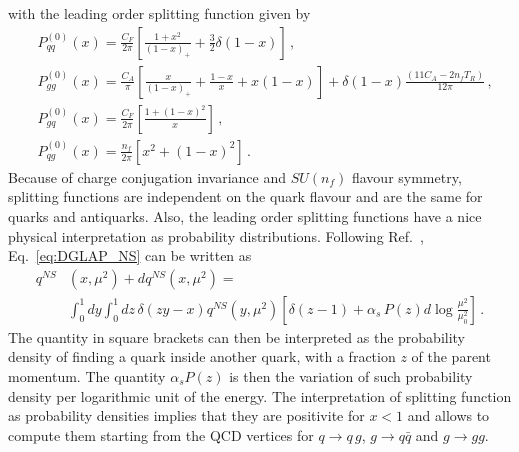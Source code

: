 with the leading order splitting function given by
\begin{align}
    &P_{qq}^{(0)}\left(x\right) = \frac{C_F}{2\pi}\left[\frac{1+x^2}{\left(1-x\right)_+} 
    + \frac{3}{2}\delta\left(1-x\right)\right]\,,\nonumber \\
    &P_{gg}^{(0)}\left(x\right) = \frac{C_A}{\pi}\left[\frac{x}{\left(1-x\right)_+}
    + \frac{1-x}{x} + x\left(1-x\right)\right] 
    +\delta\left(1-x\right)\frac{\left(11C_A - 2n_f T_R\right)}{12\pi}\,, \nonumber \\
    &P_{gq}^{(0)}\left(x\right) = \frac{C_F}{2\pi}\left[\frac{1+\left(1-x\right)^2}{x}\right]\,, \nonumber \\
    &P_{qg}^{(0)}\left(x\right) = \frac{n_f}{2\pi}\left[x^2+\left(1-x\right)^2\right]\,.
\end{align}
Because of charge conjugation invariance and $SU(n_f)$ flavour symmetry, splitting functions are independent on the quark
flavour and are the same for quarks and antiquarks. 
Also, the leading order splitting functions have a nice physical interpretation as probability distributions.
Following Ref.~\cite{ALTARELLI1977298}, Eq.~\eqref{eq:DGLAP_NS} can be written as
\begin{align}
    q^{NS}&\left(x,\mu^2\right) + dq^{NS}\left(x,\mu^2\right) = \nonumber\\
    &\int_0^1 dy\int_0^1 dz\,\delta\left(zy-x\right) q^{NS}\left(y,\mu^2\right) 
    \left[\delta\left(z-1\right) + \alpha_s\, P\left(z\right) d \log\frac{\mu^2}{\mu_0^2}\right]\,.
\end{align}
The quantity in square brackets can then be interpreted as the probability density of finding a quark
inside another quark, with a fraction $z$ of the parent momentum. The quantity $\alpha_s P\left(z\right)$
is then the variation of such probability density per logarithmic unit of the energy. The interpretation
of splitting function as probability densities implies that they are positivite for $x<1$ and allows to compute
them starting from the QCD vertices for $q\rightarrow q\,g$, $g\rightarrow q\bar{q}$ and $g\rightarrow gg$.  

